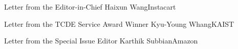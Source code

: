 \documentclass[11pt]{article}
\begin{document}


\begin{bulletin}


%
%

\begin{lettersection}


\begin{letter}{Letter from the Editor-in-Chief}
{Haixun Wang}{Instacart}

\end{letter}
%
\newpage

\begin{kletter}{Letter from the TCDE Service Award Winner}
{Kyu-Young Whang}{KAIST}

\end{kletter}

\newpage

%
%
\begin{letter}{Letter from the Special Issue Editor} %
{Karthik Subbian}{Amazon}


\end{letter}

\newpage

\end{lettersection}


\end{bulletin}
\end{document}
